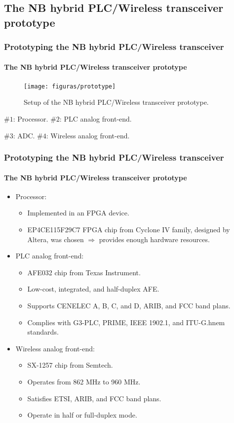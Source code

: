 \documentclass[mathserif]{beamer}
\newcommand{\wait}{\vfill}
\begin{document}
\subsection{The NB hybrid PLC/Wireless transceiver prototype}
\begin{frame}
	\frametitle{\normalsize{Prototyping the NB hybrid PLC/Wireless transceiver}}
	\framesubtitle{The NB hybrid PLC/Wireless transceiver prototype}
	\begin{figure}[ht]
		\centering
		\texttt{[image: figuras/prototype]}
		\caption{Setup of the NB hybrid PLC/Wireless transceiver prototype.}
		\label{fig:prototype}
	\end{figure}
	\begin{minipage}{.49\linewidth}
		$\#1$: Processor. \newline
		$\#2$: PLC analog front-end.
	\end{minipage}
	\begin{minipage}{.49\linewidth}
		$\#3$: ADC. \newline
		$\#4$: Wireless analog front-end.
	\end{minipage}
\end{frame}

\begin{frame}
	\frametitle{Prototyping the NB hybrid PLC/Wireless transceiver}
	\framesubtitle{The NB hybrid PLC/Wireless transceiver prototype}
	\begin{itemize}
		\item Processor: 
		\begin{itemize}
			\item Implemented in an FPGA device.
			\item  EP4CE115F29C7 FPGA chip from Cyclone IV family, designed by Altera, was chosen $\Rightarrow$ provides enough hardware resources. \wait
		\end{itemize}
		\item PLC analog front-end:
		\begin{itemize}
			\item AFE032 chip from Texas Instrument.
			\item Low-cost, integrated, and half-duplex AFE.
			\item Supports CENELEC A, B, C, and D, ARIB, and FCC band plans.
			\item Complies with G3-PLC, PRIME, IEEE 1902.1, and	ITU-G.hnem standards. \wait
		\end{itemize}
		\item Wireless analog front-end:
		\begin{itemize}
			\item SX-1257 chip from Semtech.
			\item Operates from 862 MHz	to 960 MHz.
			\item Satisfies ETSI, ARIB, and FCC band plans.
			\item Operate in half or full-duplex mode.
		\end{itemize}
	\end{itemize}
\end{frame}
\end{document}
